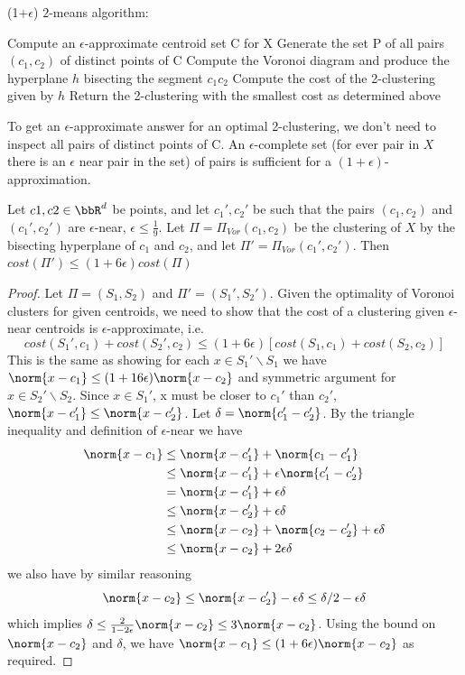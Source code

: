 \begin{algorithm}[H]
  \caption{(1+$\epsilon$) $2$-means algorithm:}
\begin{algorithmic} 
\STATE Compute an $\epsilon$-approximate centroid set C for X
\STATE Generate the set P of all pairs $(c_1, c_2)$ of distinct points of C
    \STATE Compute the Voronoi diagram and produce the hyperplane $h$ bisecting the segment $c_1 c_2$
    \STATE Compute the cost of the 2-clustering given by $h$
\ENDFOR
\STATE Return the 2-clustering with the smallest cost as determined above
\end{algorithmic}
\end{algorithm}

To get an $\epsilon$-approximate answer for an optimal 2-clustering, we don't need to inspect all pairs of distinct points of C.  An $\epsilon$-complete set (for ever pair in $X$ there is an $\epsilon$ near pair in the set) of pairs is sufficient for a $(1+\epsilon)$-approximation. 

\begin{lemma}
Let $c1, c2 \in \bbR^d$ be points, and let $c_1', c_2'$ be such that the pairs $(c_1,c_2)$ and $(c_1',c_2')$ are $\epsilon$-near, $\epsilon \leq \frac{1}{9}$. Let $\Pi = \Pi_{Vor}(c_1, c_2)$ be the clustering of $X$ by the bisecting hyperplane of $c_1$ and $c_2$, and let $\Pi' = \Pi_{Vor}(c_1', c_2')$. Then $cost(\Pi')\leq (1+ 6 \epsilon)cost(\Pi)$
\end{lemma}

\begin{proof}
Let $\Pi = (S_1, S_2)$ and $\Pi' = (S_1', S_2')$. Given the optimality of Voronoi
  clusters for given centroids, we need to show that the cost of a clustering
  given $\epsilon$-near centroids is $\epsilon$-approximate, i.e. $$cost(S_1', c_1)
  + cost(S_2' , c_2) \leq (1 + 6\epsilon)[cost(S_1, c_1) + cost(S_2 , c_2)]$$ This
  is the same as showing for each $x \in S_1' \backslash S_1$ we have $\norm{x-c_1}
  \leq (1+16\epsilon)\norm{x-c_2}$ and symmetric argument for $x \in S_2' \backslash S_2$.
  Since $x \in S_1'$, x must be closer to $c_1'$ than $c_2'$, $\norm{x-c_1'}\leq  \norm{x-c_2'}$.
  Let $\delta = \norm{c_1'-c_2'}$. By the triangle inequality and definition of $\epsilon$-near we have
\begin{align*}
    \norm{x-c_1} &  \leq \norm{x-c_1'} + \norm{c_1-c_1'} \\
    & \leq \norm{x-c_1'} + \epsilon \norm{c_1'-c_2'}\\
    & = \norm{x-c_1'} + \epsilon \delta \\
    & \leq \norm{x-c_2'}+ \epsilon \delta \\
    & \leq \norm{x-c_2} + \norm{c_2-c_2'} + \epsilon \delta \\
    & \leq \norm{x-c_2} + 2\epsilon \delta
\end{align*}
we also have by similar reasoning
$$\norm{x-c_2}\leq \norm{x-c_2'} - \epsilon \delta \leq \delta/2 - \epsilon \delta$$
which implies $\delta \leq \frac{2}{1-2\epsilon}\norm{x-c_2}\leq 3 \norm{x-c_2}$. Using the bound on $\norm{x-c_2}$ and $\delta$, we have $\norm{x-c_1} \leq (1+ 6\epsilon)\norm{x-c_2}$ as required. 
\end{proof}

